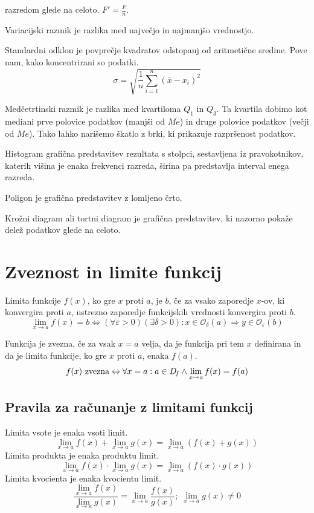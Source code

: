 \documentclass[a4paper,oneside,12pt,fleqn]{article}
\newcommand\krat\cdot
\renewcommand\implies\Rightarrow
\renewcommand\iff\Leftrightarrow
\numberwithin{equation}{section}
\newenvironment{description*}%
{
\vspace{-12pt}%
\begin{description}%
\setlength{\itemsep}{0pt}%
\setlength{\parskip}{2pt}}%
{\end{description}}
\begin{document}
\begin{description*}
    razredom glede na celoto. $F' = \frac{F}{n}$.
  \item[Variacijski razmik] je razlika med največjo in najmanjšo vrednostjo.
  \item[Standardni odklon] je povprečje kvadratov odstopanj od aritmetične sredine. Pove
    nam, kako koncentrirani so podatki. 
    \[ \sigma = \sqrt{\frac{1}{n}\sum_{i=1}^n\left(\bar{x}-x_i\right)^2} \]
  \item[Medčetrtinski razmik] je razlika med kvartiloma $Q_1$ in $Q_3$. Ta kvartila dobimo
    kot mediani prve polovice podatkov (manjši od $Me$) in druge polovice podatkov 
    (večji od $Me$). Tako lahko narišemo škatlo z brki, ki prikazuje razpršenost podatkov.
  \item[Histogram] grafična predstavitev rezultata s stolpci, sestavljena iz
    pravokotnikov, katerih višina je enaka frekvenci razreda, širina pa
    predstavlja interval enega razreda.
  \item[Poligon] je grafična predstavitev z lomljeno črto.
  \item[Krožni diagram] ali tortni diagram je grafična predstavitev, ki nazorno pokaže
    delež podatkov glede na celoto.
\end{description*}


\section{Zveznost in limite funkcij}
\label{sec:zvez}
Limita funkcije $f(x)$, ko gre $x$ proti $a$, je $b$, če za vsako zaporedje $x$-ov, ki
konvergira proti $a$, ustrezno zaporedje funkcijskih vrednosti konvergira proti $b$.
\[ \lim_{x\rightarrow a} f(x) = b \iff (\forall\varepsilon>0)(\exists\delta>0): x \in
\mathcal{O}_\delta(a) \implies y \in \mathcal{O}_\varepsilon(b) \]

Funkcija je zvezna, če za vsak $x = a$ velja, da je funkcija pri tem $x$ definirana in da je
limita funkcije, ko gre $x$ proti $a$, enaka $f(a)$.
\[ f(x) \textnormal{ zvezna} \iff \forall x = a: a \in D_{\!f} \land \lim_{x\rightarrow a} f(x) = f(a) \]

\subsection{Pravila za računanje z limitami funkcij}
\label{sec:zvez:prav}
Limita vsote je enaka vsoti limit.
\[ \lim_{x\rightarrow a}f(x) + \lim_{x\rightarrow a}g(x) = \lim_{x\rightarrow a}
\left(f(x)+g(x)\right) \]
Limita produkta je enaka produktu limit.
\[ \lim_{x\rightarrow a}f(x) \krat \lim_{x\rightarrow a}g(x) = \lim_{x\rightarrow a}
\left(f(x)\krat g(x)\right) \]
Limita kvocienta je enaka kvocientu limit.
\[ \frac{\displaystyle \lim_{x\rightarrow a}f(x)}{\displaystyle \lim_{x\rightarrow a}g(x)} = \lim_{x\rightarrow a}
\frac{f(x)}{g(x)}; \; \lim_{x\rightarrow a} g(x) \neq 0 \]
\end{document}
